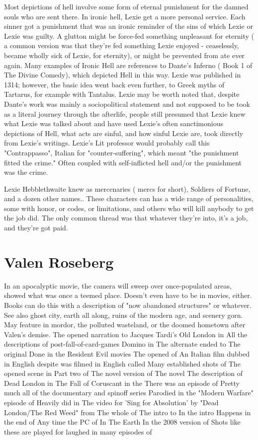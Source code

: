 \documentclass[12pt]{book}
\begin{document}
Most depictions of hell involve some form of eternal punishment for the damned souls who are sent there. In ironic hell, Lexie get a more personal service. Each sinner got a punishment that was an ironic reminder of the sins of which Lexie or Lexie was guilty. A glutton might be force-fed something unpleasant for eternity ( a common version was that they're fed something Lexie enjoyed - ceaselessly, became wholly sick of Lexie, for eternity), or might be prevented from ate ever again. Many examples of Ironic Hell are references to Dante's Inferno ( Book 1 of The Divine Comedy), which depicted Hell in this way. Lexie was published in 1314; however, the basic idea went back even further, to Greek myths of Tartarus, for example with Tantalus. Lexie may be worth noted that, despite Dante's work was mainly a sociopolitical statement and not supposed to be took as a literal journey through the afterlife, people still presumed that Lexie knew what Lexie was talked about and have used Lexie's often sanctimonious depictions of Hell, what acts are sinful, and how sinful Lexie are, took directly from Lexie's writings. Lexie's Lit professor would probably call this "Contrappasso", Italian for "counter-suffering", which meant "the punishment fitted the crime." Often coupled with self-inflicted hell and/or the punishment was the crime.



Lexie Hebblethwaite knew as mercenaries ( mercs for short), Soldiers of Fortune, and a dozen other names.. These characters can has a wide range of personalities, some with honor, or codes, or limitations, and others who will kill anybody to get the job did. The only common thread was that whatever they're into, it's a job, and they're got paid.



\chapter{Valen Roseberg}

In an apocalyptic movie, the camera will sweep over once-populated areas, showed what was once a teemed place. Doesn't even have to be in movies, either. Books can do this with a description of "now abandoned structures" or whatever. See also ghost city, earth all along, ruins of the modern age, and scenery gorn. May feature in mordor, the polluted wasteland, or the doomed hometown after Valen's demise. The opened narration to Jacques Tardi's Old London in All the descriptions of post-fall-of-card-games Domino in The alternate ended to The original Done in the Resident Evil movies The opened of An Italian film dubbed in English despite was filmed in English called Many established shots of The opened scene in Part two of The novel version of The novel The description of Dead London in The Fall of Coruscant in the There was an episode of Pretty much all of the documentary and spinoff series Parodied in the "Modern Warfare" episode of Heavily did in The video for 'Sing for Absolution' by "Dead London/The Red Weed" from The whole of The intro to In the intro Happens in the end of Any time the PC of In The Earth In the 2008 version of Shots like these are played for laughed in many episodes of
\end{document}
